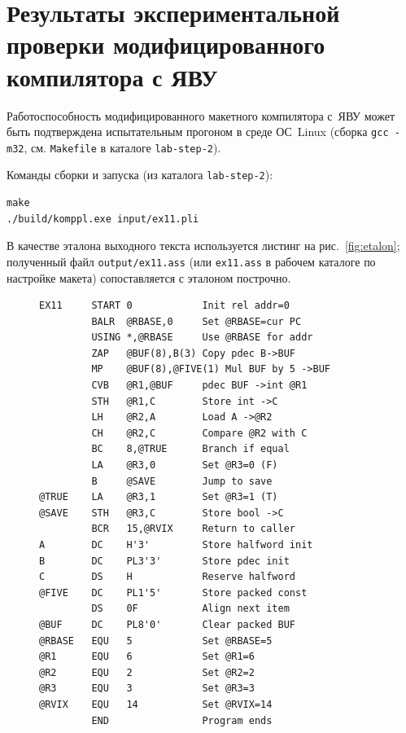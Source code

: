 \documentclass[a4paper,14pt]{extarticle}
\begin{document}
\section{Результаты экспериментальной проверки модифицированного компилятора с ЯВУ}

Работоспособность модифицированного макетного компилятора с~ЯВУ может быть подтверждена испытательным прогоном в среде ОС~Linux
(сборка \texttt{gcc~-m32}, см. \texttt{Makefile} в каталоге \texttt{lab-step-2}).

Команды сборки и запуска (из каталога \texttt{lab-step-2}):

\begin{lstlisting}[style=ASMstyle,caption={Сборка и запуск компилятора},label=lst:build4]
make
./build/komppl.exe input/ex11.pli
\end{lstlisting}

В качестве эталона выходного текста используется листинг на рис.~\ref{fig:etalon}; полученный файл \texttt{output/ex11.ass} (или
\texttt{ex11.ass} в рабочем каталоге по настройке макета) сопоставляется с эталоном построчно.

\begin{figure}[H]
\begin{lstlisting}[style=ASMstyle,caption={Ожидаемый фрагмент ассемблерного вывода (совпадение с рис.~\ref{fig:etalon})},label=lst:result_asm4]
EX11     START 0            Init rel addr=0
         BALR  @RBASE,0     Set @RBASE=cur PC
         USING *,@RBASE     Use @RBASE for addr
         ZAP   @BUF(8),B(3) Copy pdec B->BUF
         MP    @BUF(8),@FIVE(1) Mul BUF by 5 ->BUF
         CVB   @R1,@BUF     pdec BUF ->int @R1
         STH   @R1,C        Store int ->C
         LH    @R2,A        Load A ->@R2
         CH    @R2,C        Compare @R2 with C
         BC    8,@TRUE      Branch if equal
         LA    @R3,0        Set @R3=0 (F)
         B     @SAVE        Jump to save
@TRUE    LA    @R3,1        Set @R3=1 (T)
@SAVE    STH   @R3,C        Store bool ->C
         BCR   15,@RVIX     Return to caller
A        DC    H'3'         Store halfword init
B        DC    PL3'3'       Store pdec init
C        DS    H            Reserve halfword
@FIVE    DC    PL1'5'       Store packed const
         DS    0F           Align next item
@BUF     DC    PL8'0'       Clear packed BUF
@RBASE   EQU   5            Set @RBASE=5
@R1      EQU   6            Set @R1=6
@R2      EQU   2            Set @R2=2
@R3      EQU   3            Set @R3=3
@RVIX    EQU   14           Set @RVIX=14
         END                Program ends
\end{lstlisting}
\end{figure}
\end{document}
